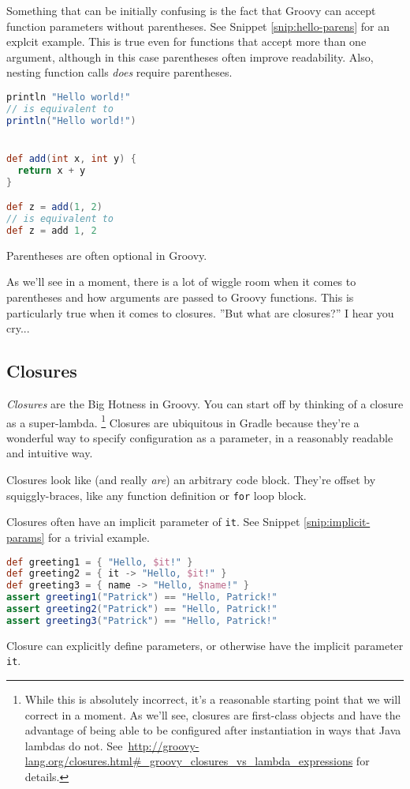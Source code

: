 \documentclass[]{article}
\theoremstyle{definition}
\newcommand{\startSnippetFig}{%
\begin{snippet}[t]
  \begin{minipage}[c]{.6\textwidth}
    \begin{framed}
}
\newcommand{\stopSnippetFig}{%
    \end{framed}
  \end{minipage}
\end{snippet}
}
\begin{document}
Something that can be initially confusing is the fact that Groovy can accept function parameters
  without parentheses.
See Snippet \ref{snip:hello-parens} for an explcit example.
This is true even for functions that accept more than one argument,
  although in this case parentheses often improve readability.
Also, nesting function calls \emph{does} require parentheses.


\startSnippetFig
\begin{lstlisting}[language=Groovy]
println "Hello world!"
// is equivalent to
println("Hello world!")


def add(int x, int y) {
  return x + y
}

def z = add(1, 2)
// is equivalent to
def z = add 1, 2
\end{lstlisting}
\caption{Parentheses are often optional in Groovy.}
\label{snip:hello-parens}
\stopSnippetFig

As we'll see in a moment, there is a lot of wiggle room when it comes to parentheses
  and how arguments are passed to Groovy functions.
This is particularly true when it comes to closures.
''But what are closures?'' I hear you cry...

\subsection{Closures}
\textit{Closures} are the Big Hotness in Groovy.
You can start off by thinking of a closure as a super-lambda.%
\footnote{While this is absolutely incorrect, it's a reasonable starting point that we will correct in a moment.
  As we'll see, closures are first-class objects and have the advantage of being able to be configured after instantiation in ways that Java lambdas do not.
  See\ \url{http://groovy-lang.org/closures.html\#\_groovy_closures_vs_lambda_expressions} for details.}
Closures are ubiquitous in Gradle because they're a wonderful way to specify configuration as a parameter, in a reasonably readable and intuitive way.

Closures look like (and really \emph{are}) an arbitrary code block.
They're offset by squiggly-braces, like any function definition or \texttt{for} loop block.

Closures often have an implicit parameter of \texttt{it}.
See Snippet \ref{snip:implicit-params} for a trivial example.

\startSnippetFig
      \begin{lstlisting}[language=Groovy]
def greeting1 = { "Hello, $it!" }
def greeting2 = { it -> "Hello, $it!" }
def greeting3 = { name -> "Hello, $name!" }
assert greeting1("Patrick") == "Hello, Patrick!"
assert greeting2("Patrick") == "Hello, Patrick!"
assert greeting3("Patrick") == "Hello, Patrick!"
\end{lstlisting}
    \caption{Closure can explicitly define parameters, or otherwise have the implicit parameter \texttt{it}.}
    \label{snip:implicit-params}
\stopSnippetFig
\end{document}
